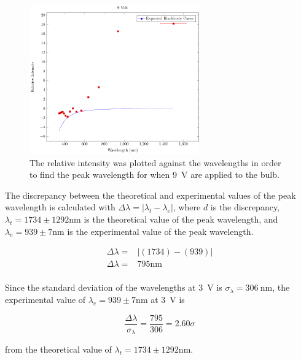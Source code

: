 \documentclass[a4paper]{article}
\begin{document}
\begin{figure}[H]
  \begin{center}
    \includegraphics[width=0.65\textwidth]{P6-BlackbodyRadiation/Plots/9Volt/9volt.pdf}
  \end{center}
  \label{gph:9volt}
  \caption{The relative intensity was plotted against the wavelengths in order
    to find the peak wavelength for when \SI{9}{\volt} are applied to the bulb.}
\end{figure}

\qq The discrepancy between the theoretical and experimental values of the peak
wavelength is calculated with
\( \Delta \lambda = | \lambda_t - \lambda_e | \), where \( d \) is the
discrepancy, \( \lambda_t = 1734 \pm 1292 \si{\nano\meter} \) is the theoretical
value of the peak wavelength, and
\( \lambda_e = 939 \pm 7 \si{\nano\meter} \) is the experimental value of
the peak wavelength.

\begin{align*}
  \Delta \lambda =& \left| (1734) - (939) \right| \\
  \Delta \lambda =& 795 \si{\nano\meter} \\
\end{align*}

Since the standard deviation of the wavelengths at \SI{3}{\volt} is \(
\sigma_{\lambda} = \SI{306}{\nano\meter} \), the experimental value of \(
\lambda_e = 939 \pm 7 \si{\nano\meter} \) at \SI{3}{\volt} is

\begin{equation*}
  \frac{\Delta \lambda}{\sigma_{\lambda}} = \frac{795}{306} = 2.60 \sigma
\end{equation*}

from the theoretical value of \( \lambda_t = 1734 \pm 1292 \si{\nano\meter} \).
\end{document}
